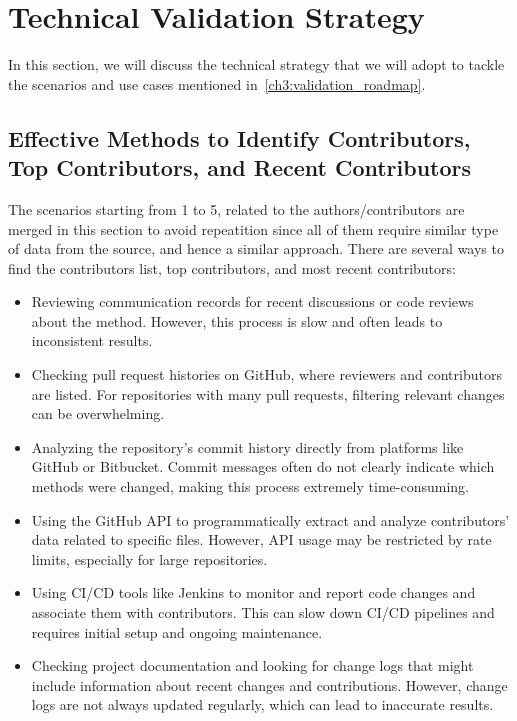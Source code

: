 \section{Technical Validation Strategy}\label{ch3-sec:technical_validation_strategy}

In this section, we will discuss the technical strategy that we will adopt to tackle the scenarios and use cases mentioned in~\autoref{ch3:validation_roadmap}.

\subsection{Effective Methods to Identify Contributors, Top Contributors, and Recent Contributors}

The scenarios starting from 1 to 5, related to the authors/contributors are merged in this section to avoid repeatition since all of them require similar type of data from the source, and hence a similar approach. There are several ways to find the contributors list, top contributors, and most recent contributors:
\begin{itemize}
    \item Reviewing communication records for recent discussions or code reviews about the method. However, this process is slow and often leads to inconsistent results.
    \item Checking pull request histories on GitHub, where reviewers and contributors are listed. For repositories with many pull requests, filtering relevant changes can be overwhelming.
    \item Analyzing the repository's commit history directly from platforms like GitHub or Bitbucket. Commit messages often do not clearly indicate which methods were changed, making this process extremely time-consuming.
    \item Using the GitHub API to programmatically extract and analyze contributors' data related to specific files. However, API usage may be restricted by rate limits, especially for large repositories.
    \item Using CI/CD tools like Jenkins to monitor and report code changes and associate them with contributors. This can slow down CI/CD pipelines and requires initial setup and ongoing maintenance.
    \item Checking project documentation and looking for change logs that might include information about recent changes and contributions. However, change logs are not always updated regularly, which can lead to inaccurate results.
\end{itemize}

